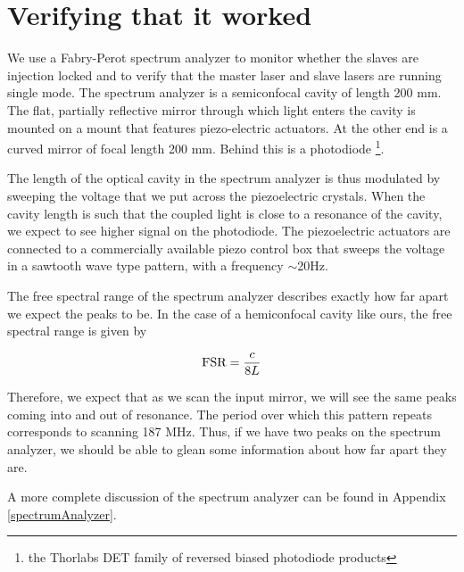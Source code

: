 \section{Verifying that it worked}
We use a Fabry-Perot spectrum analyzer to monitor whether the slaves are injection locked and to verify that the master laser and slave lasers are running single mode. 
The spectrum analyzer is a semiconfocal cavity of length 200 mm. The flat, partially reflective mirror through which light enters the cavity is mounted on a mount that features piezo-electric actuators. At the other end is a curved mirror of focal length 200 mm. Behind this is a photodiode \footnote{the Thorlabs DET family of reversed biased photodiode products}.

The length of the optical cavity in the spectrum analyzer is thus modulated by sweeping the voltage that we put across the piezoelectric crystals. When the cavity length is such that the coupled light is close to a resonance of the cavity, we expect to see higher signal on the photodiode. 
The piezoelectric actuators are connected to a commercially available piezo control box that sweeps the voltage in a sawtooth wave type pattern, with a frequency $\sim$20Hz. 

The free spectral range of the spectrum analyzer describes exactly how far apart we expect the peaks to be. In the case of a hemiconfocal cavity like ours, the free spectral range is given by 

\begin{equation}
    \textnormal{FSR}=\frac{c}{8L}
\end{equation}

Therefore, we expect that as we scan the input mirror, we will see the same peaks coming into and out of resonance. The period over which this pattern repeats corresponds to scanning 187 MHz. Thus, if we have two peaks on the spectrum analyzer, we should be able to glean some information about how far apart they are.

A more complete discussion of the spectrum analyzer can be found in Appendix \ref{spectrumAnalyzer}.

